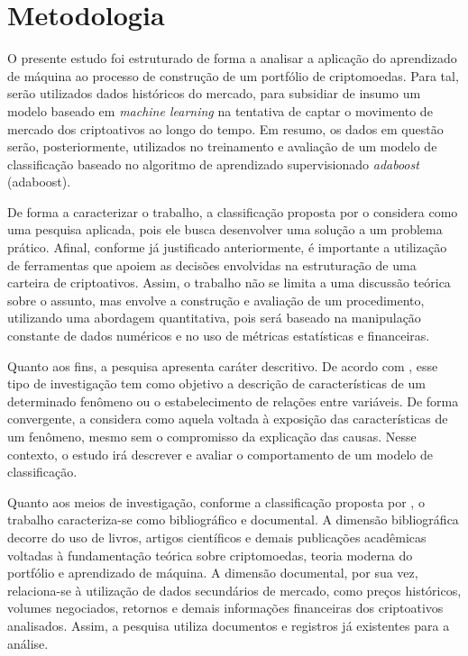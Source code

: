 
\chapter{Metodologia}
\label{chap_metodologia}

O presente estudo foi estruturado de forma a analisar a aplicação do aprendizado de máquina ao processo de construção de um portfólio de criptomoedas. Para tal, serão utilizados dados históricos do mercado, para subsidiar de insumo um modelo baseado em \textit{machine learning} na tentativa de captar o movimento de mercado dos criptoativos ao longo do tempo. Em resumo, os dados em questão serão, posteriormente, utilizados no treinamento e avaliação de um modelo de classificação baseado no algoritmo de aprendizado supervisionado \textit{\acl{adaboost}} (\acs{adaboost}).

De forma a caracterizar o trabalho, a classificação proposta por  o considera como uma pesquisa aplicada, pois ele busca desenvolver uma solução a um problema prático. Afinal, conforme já justificado anteriormente, é importante a utilização de ferramentas que apoiem as decisões envolvidas na estruturação de uma carteira de criptoativos. Assim, o trabalho não se limita a uma discussão teórica sobre o assunto, mas envolve a construção e avaliação de um procedimento, utilizando uma abordagem quantitativa, pois será baseado na manipulação constante de dados numéricos e no uso de métricas estatísticas e financeiras.

Quanto aos fins, a pesquisa apresenta caráter descritivo. De acordo com , esse tipo de investigação tem como objetivo a descrição de características de um determinado fenômeno ou o estabelecimento de relações entre variáveis. De forma convergente,  a considera como aquela voltada à exposição das características de um fenômeno, mesmo sem o compromisso da explicação das causas. Nesse contexto, o estudo irá descrever e avaliar o comportamento de um modelo de classificação.

Quanto aos meios de investigação, conforme a classificação proposta por , o trabalho caracteriza-se como bibliográfico e documental. A dimensão bibliográfica decorre do uso de livros, artigos científicos e demais publicações acadêmicas voltadas à fundamentação teórica sobre criptomoedas, teoria moderna do portfólio e aprendizado de máquina. A dimensão documental, por sua vez, relaciona-se à utilização de dados secundários de mercado, como preços históricos, volumes negociados, retornos e demais informações financeiras dos criptoativos analisados. Assim, a pesquisa utiliza documentos e registros já existentes para a análise.

